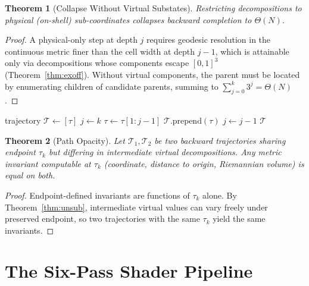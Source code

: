 \documentclass[twocolumn,10pt,a4paper]{article}
\theoremstyle{thmstyle}
\newtheorem{theorem}{Theorem}[section]
\theoremstyle{definition}
\theoremstyle{remark}
\begin{document}
\begin{theorem}[Collapse Without Virtual Substates]
\label{thm:collapse}
Restricting decompositions to physical (on-shell) sub-coordinates
collapses backward completion to $\Theta(N)$.
\end{theorem}

\begin{proof}
A physical-only step at depth $j$ requires geodesic resolution in the
continuous metric finer than the cell width at depth $j-1$, which is
attainable only via decompositions whose components escape $[0,1]^{3}$
(Theorem~\ref{thm:exoff}). Without virtual components, the parent
must be located by enumerating children of candidate parents, summing
to $\sum_{j=0}^{k}3^{j}=\Theta(N)$.
\end{proof}

\begin{algorithm}[!htbp]
\caption{Backward Completion (virtual)}
\label{alg:back}
\begin{algorithmic}[1]
\State trajectory $\mathcal{T}\gets[\tau]$
\State $j\gets k$
\State $\tau\gets\tau[1{:}j-1]$
\State $\mathcal{T}.\mathrm{prepend}(\tau)$
\State $j\gets j-1$
\EndWhile
\State \Return $\mathcal{T}$
\EndFunction
\end{algorithmic}
\end{algorithm}

\begin{theorem}[Path Opacity]
\label{thm:path}
Let $\mathcal{T}_{1},\mathcal{T}_{2}$ be two backward trajectories
sharing endpoint $\tau_{k}$ but differing in intermediate virtual
decompositions. Any metric invariant computable at $\tau_{k}$
(coordinate, distance to origin, Riemannian volume) is equal on both.
\end{theorem}

\begin{proof}
Endpoint-defined invariants are functions of $\tau_{k}$ alone. By
Theorem~\ref{thm:unsub}, intermediate virtual values can vary
freely under preserved endpoint, so two trajectories with the same
$\tau_{k}$ yield the same invariants.
\end{proof}

\section{The Six-Pass Shader Pipeline}
\label{sec:shader}
\end{document}
